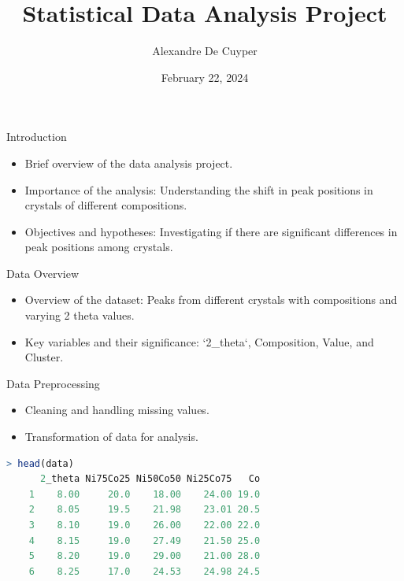 \documentclass[aspectratio=169]{beamer}
\title{Statistical Data Analysis Project}
\author{Alexandre De Cuyper}
\date{February 22, 2024}
\institute{University of A Coruña}
\begin{document}
\frame{\titlepage}

\begin{frame}{Introduction}
    \begin{itemize}
        \item Brief overview of the data analysis project.
        \item Importance of the analysis: Understanding the shift in peak positions in crystals of different compositions.
        \item Objectives and hypotheses: Investigating if there are significant differences in peak positions among crystals.
    \end{itemize}
\end{frame}

\begin{frame}{Data Overview}
    \begin{itemize}
        \item Overview of the dataset: Peaks from different crystals with compositions and varying 2 theta values.
        \item Key variables and their significance: `2_theta`, Composition, Value, and Cluster.
    \end{itemize}
\end{frame}

\begin{frame}[fragile]{Data Preprocessing}
    \begin{itemize}
        \item Cleaning and handling missing values.
        \item Transformation of data for analysis.
    \end{itemize}

    \begin{lstlisting}[language=R]
    > head(data)
      2_theta Ni75Co25 Ni50Co50 Ni25Co75   Co
    1    8.00     20.0    18.00    24.00 19.0
    2    8.05     19.5    21.98    23.01 20.5
    3    8.10     19.0    26.00    22.00 22.0
    4    8.15     19.0    27.49    21.50 25.0
    5    8.20     19.0    29.00    21.00 28.0
    6    8.25     17.0    24.53    24.98 24.5
    \end{lstlisting}
\end{frame}
\end{document}
